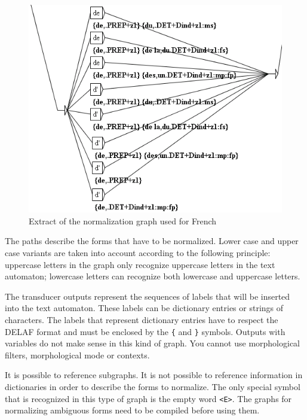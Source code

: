 \bigskip
\begin{figure}[!h]
\begin{center}
\includegraphics[width=13.5cm]{resources/img/fig6-3.png}
\caption{Extract of the normalization graph used for French\label{fig-tfst-normalization-grammar}}
\end{center}
\end{figure}

\noindent The paths describe the forms that have to be normalized. Lower case
and upper case variants are taken into account according to the following principle:
uppercase letters in the graph only recognize uppercase letters in the
text automaton;  lowercase letters can recognize both lowercase and uppercase
letters. 

\bigskip
\noindent The transducer outputs represent the sequences of labels that will be
inserted into the text automaton. These labels can be dictionary entries or strings 
of characters. The labels that
represent dictionary entries have to respect the DELAF format 
and must be enclosed by the \verb+{+ and \verb+}+ symbols. Outputs
with variables do not make sense in this kind of graph.
You cannot use morphological filters, morphological mode or contexts.

\bigskip
\noindent It is possible to reference subgraphs. It is not possible to reference
information in dictionaries in order to describe the forms to normalize. The only special
symbol that is recognized in this type of graph is the empty word
\verb+<E>+. The graphs for normalizing ambiguous forms need to
be compiled before using them.


